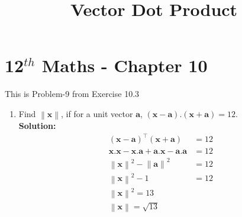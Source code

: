 \documentclass[12pt]{article}
\providecommand{\brak}[1]{\ensuremath{\left(#1\right)}}
\providecommand{\norm}[1]{\left\lVert#1\right\rVert}
\newcommand{\solution}{\noindent \textbf{Solution: }}
\let\vec\mathbf
\begin{document}
\begin{center}
\title{\textbf{Vector Dot Product}}
\date{\vspace{-5ex}} %
\maketitle
\end{center}
\setcounter{page}{1}

\section{12$^{th}$ Maths - Chapter 10}
This is Problem-9 from Exercise 10.3
\begin{enumerate}
\item Find $\norm{\vec{x}}$, if for a unit vector $\vec{a}$, $\brak{\vec{x}-\vec{a}}.\brak{\vec{x}+\vec{a}} = 12$.\\
\solution 
\begin{align*}
  \label{eq:det2f}
  \brak{\vec{x}-\vec{a}}^\top\brak{\vec{x}+\vec{a}} &= 12 \\
  \vec{x}.\vec{x} - \vec{x}.\vec{a} + \vec{a}.\vec{x} - \vec{a}.\vec{a} &= 12 \\
  \norm{\vec{x}}^{2} - \norm{\vec{a}}^{2} &= 12 \\
  \norm{\vec{x}}^{2} - 1 &= 12  \\
  \norm{\vec{x}}^{2} = 13 \\
  \norm{\vec{x}} = \sqrt{13}
\end{align*}
\end{enumerate}
\end{document}
